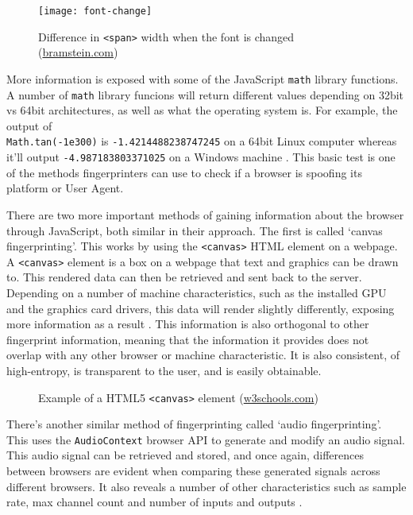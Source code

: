 \begin{figure}[h]
\texttt{[image: font-change]}
\centering
\caption{Difference in \texttt{<span>} width when the font is changed (\url{bramstein.com})}
\label{fig:font-change}
\end{figure}

More information is exposed with some of the JavaScript \texttt{math} library functions.
A number of \texttt{math} library funcions will return different values depending on 32bit vs 64bit architectures, as well as what the operating system is.
For example, the output of \\
\texttt{Math.tan(-1e300)} is \texttt{-1.4214488238747245} on a 64bit Linux computer whereas it'll output \texttt{-4.987183803371025} on a Windows machine \citep{floating-point-bug}.
This basic test is one of the methods fingerprinters can use to check if a browser is spoofing its platform or User Agent.

There are two more important methods of gaining information about the browser through JavaScript, both similar in their approach.
The first is called `canvas fingerprinting'.
This works by using the \texttt{<canvas>} HTML element on a webpage.
A \texttt{<canvas>} element is a box on a webpage that text and graphics can be drawn to.
This rendered data can then be retrieved and sent back to the server.
Depending on a number of machine characteristics, such as the installed GPU and the graphics card drivers, this data will render slightly differently, exposing more information as a result \citep{canvas-fingerprint}.
This information is also orthogonal to other fingerprint information, meaning that the information it provides does not overlap with any other browser or machine characteristic.
It is also consistent, of high-entropy, is transparent to the user, and is easily obtainable.

\begin{figure}[h]
\centering
\label{fig:canvas-example}
\caption{Example of a HTML5 \texttt{<canvas>} element (\url{w3schools.com})}
\end{figure}

There's another similar method of fingerprinting called `audio fingerprinting'.
This uses the \texttt{AudioContext} browser API to generate and modify an audio signal.
This audio signal can be retrieved and stored, and once again, differences between browsers are evident when comparing these generated signals across different browsers.
It also reveals a number of other characteristics such as sample rate, max channel count and number of inputs and outputs \citep{audio-fingerprint}.

